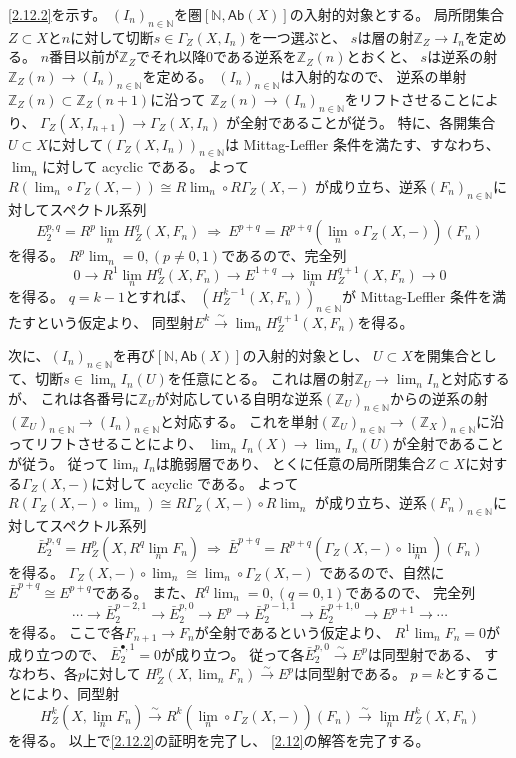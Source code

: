 \documentclass[uplatex,dvipdfmx]{jsarticle}
\makeatletter
\theoremstyle{definition}
\renewenvironment{proof}[1][\proofname]{
  \pushQED{\qed}%
  \normalfont \topsep6\p@\@plus6\p@\relax
  \trivlist
  \item[\hskip\labelsep
    #1\@addpunct{\textbf{.}}]\ignorespaces
}{%
  \popQED\endtrivlist\@endpefalse
}
\providecommand{\proofname}{証明}
\newcommand{\Ab}{\mathsf{Ab}}
\newcommand\Z{\mathbb{Z}}
\newcommand\N{\mathbb{N}}
\makeatother
\begin{document}
\begin{proof}
  \ref{2.12.2}を示す。
  \((I_n)_{n\in \N}\)を圏\([\N,\Ab(X)]\)の入射的対象とする。
  局所閉集合\(Z\subset X\)と\(n\)に対して切断\(s\in \Gamma_Z(X,I_n)\)を一つ選ぶと、
  \(s\)は層の射\(\Z_Z\to I_n\)を定める。
  \(n\)番目以前が\(\Z_Z\)でそれ以降\(0\)である逆系を\(\Z_Z(n)\)とおくと、
  \(s\)は逆系の射\(\Z_Z(n)\to (I_n)_{n\in \N}\)を定める。
  \((I_n)_{n\in \N}\)は入射的なので、
  逆系の単射\(\Z_Z(n)\subset \Z_Z(n+1)\)に沿って
  \(\Z_Z(n)\to (I_n)_{n\in \N}\)をリフトさせることにより、
  \(\Gamma_Z(X,I_{n+1})\to \Gamma_Z(X,I_n)\)
  が全射であることが従う。
  特に、各開集合\(U\subset X\)に対して\((\Gamma_Z(X,I_n))_{n\in \N}\)は
  Mittag-Leffler 条件を満たす、すなわち、\(\lim_n\)に対して acyclic である。
  よって\(R(\lim_n\circ\Gamma_Z(X,-)) \cong R\lim_n \circ R\Gamma_Z(X,-)\)
  が成り立ち、逆系\((F_n)_{n\in \N}\)に対してスペクトル系列
  \[
  E_2^{p,q}=R^p\lim_n H^q_Z(X,F_n) \ \Rightarrow \
  E^{p+q}=R^{p+q}(\lim_n\circ \Gamma_Z(X,-))(F_n)
  \]
  を得る。
  \(R^p\lim_n = 0, (p\neq 0,1)\)であるので、完全列
  \[
  0\to R^1\lim_n H^q_Z(X,F_n) \to E^{1+q} \to \lim_n H^{q+1}_Z(X,F_n)\to 0
  \]
  を得る。
  \(q=k-1\)とすれば、
  \((H^{k-1}_Z(X,F_n))_{n\in \N}\)が Mittag-Leffler 条件を満たすという仮定より、
  同型射\(E^k\xrightarrow{\sim} \lim_n H^{q+1}_Z(X,F_n)\)を得る。

  次に、\((I_n)_{n\in \N}\)を再び\([\N,\Ab(X)]\)の入射的対象とし、
  \(U\subset X\)を開集合として、切断\(s\in \lim_n I_n(U)\)を任意にとる。
  これは層の射\(\Z_U\to \lim_n I_n\)と対応するが、
  これは各番号に\(\Z_U\)が対応している自明な逆系\((\Z_U)_{n\in \N}\)からの逆系の射
  \((\Z_U)_{n\in \N}\to (I_n)_{n\in \N}\)と対応する。
  これを単射\((\Z_U)_{n\in \N}\to (\Z_X)_{n\in \N}\)に沿ってリフトさせることにより、
  \(\lim_nI_n(X)\to \lim_nI_n(U)\)が全射であることが従う。
  従って\(\lim_n I_n\)は脆弱層であり、
  とくに任意の局所閉集合\(Z\subset X\)に対する\(\Gamma_Z(X,-)\)に対して acyclic である。
  よって\(R(\Gamma_Z(X,-)\circ \lim_n) \cong R\Gamma_Z(X,-)\circ R\lim_n\)
  が成り立ち、逆系\((F_n)_{n\in \N}\)に対してスペクトル系列
  \[
  \bar{E}_2^{p,q}=H^p_Z(X,R^q\lim_n F_n) \ \Rightarrow \
  \bar{E}^{p+q}=R^{p+q}(\Gamma_Z(X,-)\circ \lim_n)(F_n)
  \]
  を得る。
  \(\Gamma_Z(X,-)\circ \lim_n\cong \lim_n\circ \Gamma_Z(X,-)\)
  であるので、自然に\(\bar{E}^{p+q}\cong E^{p+q}\)である。
  また、\(R^q\lim_n = 0, (q=0,1)\)であるので、
  完全列
  \[
  \cdots \to \bar{E}_2^{p-2,1} \to \bar{E}_2^{p,0} \to E^p
  \to \bar{E}_2^{p-1,1}\to \bar{E}_2^{p+1,0} \to E^{p+1} \to \cdots
  \]
  を得る。
  ここで各\(F_{n+1}\to F_n\)が全射であるという仮定より、
  \(R^1\lim_n F_n=0\)が成り立つので、
  \(\bar{E}_2^{\bullet,1}=0\)が成り立つ。
  従って各\(\bar{E}_2^{p,0} \xrightarrow{\sim} E^p\)は同型射である、
  すなわち、各\(p\)に対して
  \(H^p_Z(X,\lim_n F_n) \xrightarrow{\sim} E^p\)は同型射である。
  \(p=k\)とすることにより、同型射
  \[
  H^k_Z(X,\lim_n F_n) \xrightarrow{\sim}
  R^k(\lim_n\circ \Gamma_Z(X,-))(F_n) \xrightarrow{\sim}
  \lim_n H^k_Z(X,F_n)
  \]
  を得る。
  以上で\ref{2.12.2}の証明を完了し、
  \autoref{2.12}の解答を完了する。
\end{proof}
\end{document}
